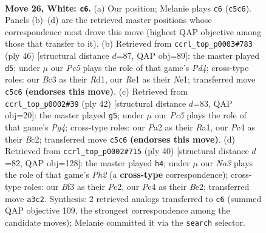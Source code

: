 \documentclass[11pt]{article}
\begin{document}
\clearpage

\begin{figure}[p]\centering
\begin{subfigure}{0.46\textwidth}\centering
\resizebox{\linewidth}{!}{%
\newchessgame
\chessboard[
  setfen={1rb2r2/p2nnp1k/1p2p1pp/2P5/1RP5/N1B1PB1P/P4PP1/4RK2 w - - 10 26},
  showmover=false,
  pgfstyle=straightmove, color=movearrow, markmove={c5-c6}
]}
\caption{}
\end{subfigure}\hfill
\begin{subfigure}{0.46\textwidth}\centering
\resizebox{\linewidth}{!}{%
\newchessgame
\chessboard[
  setfen={2rr1k2/3nbpp1/1p2p2p/p1p5/3P3P/1P2B1P1/P3PPK1/2RRN3 w - - 1 24},
  showmover=false,
  pgfstyle=straightmove, color=movearrow, markmove={d4-d5}
]}
\caption{}
\end{subfigure}
\\[4pt]
\begin{subfigure}{0.46\textwidth}\centering
\resizebox{\linewidth}{!}{%
\newchessgame
\chessboard[
  setfen={1rb3k1/pp2np2/3r2pp/3p4/P1pP2PP/2P1PN2/2B2P2/RR4K1 w - - 1 22},
  showmover=false,
  pgfstyle=straightmove, color=movearrow, markmove={g4-g5}
]}
\caption{}
\end{subfigure}\hfill
\begin{subfigure}{0.46\textwidth}\centering
\resizebox{\linewidth}{!}{%
\newchessgame
\chessboard[
  setfen={r1br2k1/5pp1/2p1pn1p/p2p4/N3P1P1/5P2/PPPRB2P/2K2R2 w - - 0 21},
  showmover=false,
  pgfstyle=straightmove, color=movearrow, markmove={h2-h4}
]}
\caption{}
\end{subfigure}
\caption{\textbf{Move 26, White: \texttt{c6}.} (a) Our position; Melanie plays \texttt{c6} (\texttt{c5c6}). Panels (b)--(d) are the retrieved master positions whose correspondence most drove this move (highest QAP objective among those that transfer to it). (b) Retrieved from \texttt{ccrl\_top\_p0003\#783} (ply 46) [structural distance $d$=87, QAP obj=89]: the master played \texttt{d5}; under $\mu$ our \emph{Pc5} plays the role of that game's \emph{Pd4}; cross-type roles: our \emph{B}c3 as their \emph{R}d1, our \emph{R}e1 as their \emph{N}e1; transferred move \texttt{c5c6} \textbf{(endorses this move)}. (c) Retrieved from \texttt{ccrl\_top\_p0002\#39} (ply 42) [structural distance $d$=83, QAP obj=20]: the master played \texttt{g5}; under $\mu$ our \emph{Pc5} plays the role of that game's \emph{Pg4}; cross-type roles: our \emph{P}a2 as their \emph{R}a1, our \emph{P}c4 as their \emph{B}c2; transferred move \texttt{c5c6} \textbf{(endorses this move)}. (d) Retrieved from \texttt{ccrl\_top\_p0002\#715} (ply 40) [structural distance $d$=82, QAP obj=128]: the master played \texttt{h4}; under $\mu$ our \emph{Na3} plays the role of that game's \emph{Ph2} (a \textbf{cross-type} correspondence); cross-type roles: our \emph{B}f3 as their \emph{P}c2, our \emph{P}c4 as their \emph{B}e2; transferred move \texttt{a3c2}. Synthesis: 2 retrieved analogs transferred to \texttt{c6} (summed QAP objective 109, the strongest correspondence among the candidate moves); Melanie committed it via the \texttt{search} selector.}
\label{fig:thought-m50}
\end{figure}
\end{document}
